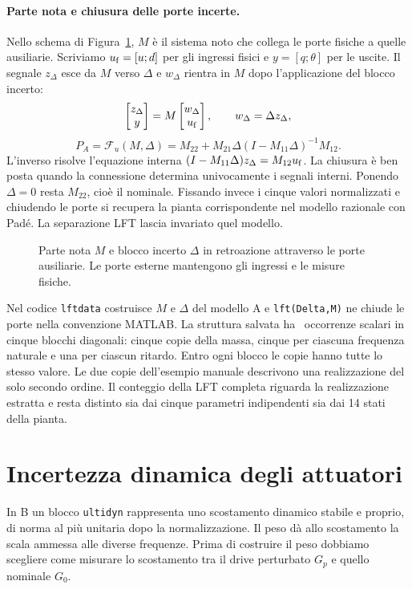 \paragraph*{Parte nota e chiusura delle porte incerte.}
Nello schema di Figura~\ref{fig:lft}, $M$ è il sistema noto che collega
le porte fisiche a quelle ausiliarie. Scriviamo $u_{\rm f}=[u;d]$ per
gli ingressi fisici e $y=[q;\theta]$ per le uscite. Il segnale $z_\Delta$
esce da $M$ verso $\Delta$ e $w_\Delta$ rientra in $M$ dopo
l'applicazione del blocco incerto:
\[
 \begin{bmatrix}z_\Delta\\y\end{bmatrix}
 =M\begin{bmatrix}w_\Delta\\u_{\rm f}\end{bmatrix},\qquad
 w_\Delta=\Delta z_\Delta,
\]
\[
 P_A=\mathcal F_u(M,\Delta)
 =M_{22}+M_{21}\Delta(I-M_{11}\Delta)^{-1}M_{12}.
\]
L'inverso risolve l'equazione interna
$(I-M_{11}\Delta)z_\Delta=M_{12}u_{\rm f}$. La chiusura è ben posta
quando la connessione determina univocamente i segnali interni.
Ponendo $\Delta=0$ resta $M_{22}$, cioè il nominale. Fissando invece
i cinque valori normalizzati e chiudendo le porte si recupera la
pianta corrispondente nel modello razionale con Padé. La separazione
LFT lascia invariato quel modello.

\begin{figure}[!htbp]\centering
\resizebox{.85\textwidth}{!}{}
\caption{Parte nota $M$ e blocco incerto $\Delta$ in retroazione
attraverso le porte ausiliarie. Le porte esterne mantengono gli
ingressi e le misure fisiche.}\label{fig:lft}
\end{figure}

Nel codice \texttt{lftdata} costruisce $M$ e $\Delta$ del modello A e
\texttt{lft(Delta,M)} ne chiude le porte nella convenzione MATLAB.
La struttura salvata ha \FinOccorrenze\ occorrenze scalari in cinque
blocchi diagonali: cinque copie della massa, cinque per ciascuna
frequenza naturale e una per ciascun ritardo. Entro ogni blocco le
copie hanno tutte lo stesso valore. Le due copie dell'esempio manuale
descrivono una realizzazione del solo secondo ordine. Il conteggio
della LFT completa riguarda la realizzazione estratta e resta
distinto sia dai cinque parametri indipendenti sia dai 14 stati
della pianta.

\section{Incertezza dinamica degli attuatori}
In B un blocco \texttt{ultidyn} rappresenta uno scostamento dinamico
stabile e proprio, di norma al più unitaria dopo la normalizzazione.
Il peso dà allo scostamento la scala ammessa alle diverse frequenze.
Prima di costruire il peso dobbiamo scegliere come misurare lo
scostamento tra il drive perturbato $G_p$ e quello nominale $G_0$.

